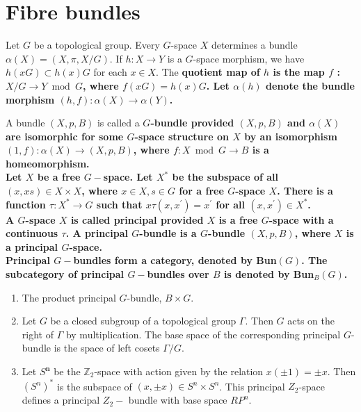 \section{Fibre bundles}

Let $G$ be a topological group. 
Every $G$-space $X$ determines a bundle $\alpha(X)=(X, \pi, X / G)$. If $h: X \rightarrow Y$ is a $G$-space morphism, we have $h(x G) \subset h(x) G$ for each $x \in X$. The \bf{quotient map of $h$} is the map $f$ : $X / G \rightarrow Y \bmod G$, where $f(x G)=h(x) G$. Let $\alpha(h)$ denote the bundle morphism $(h, f): \alpha(X) \rightarrow \alpha(Y)$.

A bundle $(X, p, B)$ is called a \bf{$G$-bundle} provided $(X, p, B)$ and $\alpha(X)$ are isomorphic for some $G$-space structure on $X$ by an isomorphism $(1, f): \alpha(X) \rightarrow(X, p, B)$, where $f: X \bmod G \rightarrow B$ is a homeomorphism.\\

Let $X$ be a free $G-$space. Let $X^*$ be the subspace of all $(x, x s) \in X \times X$, where $x \in X, s \in G$ for a free $G$-space $X$. There is a function $\tau: X^* \rightarrow G$ such that $x \tau\left(x, x^{\prime}\right)=x^{\prime}$ for all $\left(x, x^{\prime}\right) \in X^*$. \\
A $G$-space $X$ is called \bf{principal} provided $X$ is a free $G$-space with a continuous $\tau$. A \bf{principal $G$-bundle} is a $G$-bundle $(X, p, B)$, where $X$ is a principal $G$-space.\\
Principal $G-$bundles form a category, denoted by Bun$(G)$. The subcategory of principal $G-$bundles over $B$ is denoted by Bun$_B(G)$.

\begin{example}
    \begin{enumerate}
        \item The product principal $G$-bundle, $B\times G$.
        \item Let $G$ be a closed subgroup of a topological group $\Gamma$. Then $G$ acts on the right of $\Gamma$ by multiplication. The base space of the corresponding principal $G$-bundle is the space of left cosets $\Gamma / G$. 
        \item Let $S^{\boldsymbol{n}}$ be the $\mathbb{Z}_2$-space with action given by the relation $x( \pm 1)= \pm x$. Then $\left(S^n\right)^*$ is the subspace of $(x, \pm x) \in S^n \times S^n$. This principal $Z_2$-space defines a principal $Z_{2}-$ bundle with base space $R P^n$.
    \end{enumerate}
\end{example}

